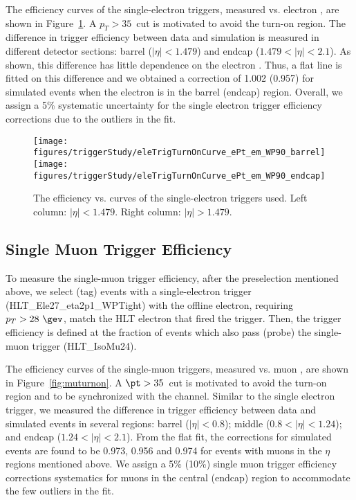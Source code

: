 The efficiency curves of the single-electron triggers, measured
vs. electron \pt, are shown in Figure~\ref{fig:eturnon}. A
$p_{T}>35$~\gev cut is motivated to avoid the turn-on region. The 
difference in trigger efficiency between data and simulation is 
measured in different detector sections: barrel ($|\eta| < 1.479$) 
and endcap ($1.479 < |\eta| < 2.1$). As shown, this difference has 
little dependence on the electron \pt. Thus, a flat line is fitted 
on this difference and we obtained a correction of 1.002 (0.957) 
for simulated events when the electron is in the barrel (endcap) 
region. Overall, we assign a 5\% systematic uncertainty for the 
single electron trigger efficiency corrections due to the outliers 
in the fit.


\begin{figure}\centering
  \texttt{[image: figures/triggerStudy/eleTrigTurnOnCurve\_ePt\_em\_WP90\_barrel]}
  \texttt{[image: figures/triggerStudy/eleTrigTurnOnCurve\_ePt\_em\_WP90\_endcap]}
  \caption{\label{fig:eturnon} The efficiency vs. \pt curves of the
    single-electron triggers used. Left column: $|\eta|<1.479$. Right column: $|\eta|>1.479$.}
\end{figure}

\subsection{Single Muon Trigger Efficiency}\label{sec:muTrigger}

To measure the single-muon trigger efficiency, after the preselection
mentioned above, we select (tag) events with a single-electron trigger 
(HLT\_Ele27\_eta2p1\_WPTight) with the offline electron, requiring 
$p_T > 28~\gev$, match the HLT electron that fired the trigger. Then, 
the trigger efficiency is defined at the fraction of events which also 
pass (probe) the single-muon trigger (HLT\_IsoMu24).

The efficiency curves of the single-muon triggers, measured vs. muon
\pt, are shown in Figure~\ref{fig:muturnon}. A $\pt>35$~\gev cut is
motivated to avoid the turn-on region and to be synchronized with the \teth 
channel. Similar to the single electron trigger, we measured the difference 
in trigger efficiency between data and simulated events in several regions: 
barrel ($|\eta| < 0.8$); middle ($0.8 < |\eta| < 1.24$); and endcap 
($1.24 < |\eta| < 2.1$). From the flat fit, the corrections for simulated 
events are found to be 0.973, 0.956 and 0.974 for events with muons in 
the $\eta$ regions mentioned above. We assign a 5\% (10\%) single muon trigger 
efficiency corrections systematics for muons in the central (endcap) region 
to accommodate the few outliers in the fit.

